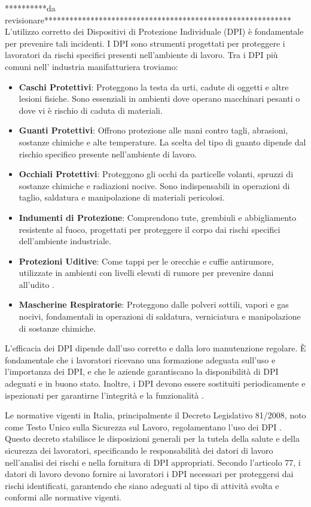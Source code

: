 **********da revisionare***********************************************************
\noindent L'utilizzo corretto dei Dispositivi di Protezione Individuale (DPI) è fondamentale per prevenire tali incidenti. I DPI sono strumenti progettati per proteggere i lavoratori da rischi specifici presenti nell'ambiente di lavoro. Tra i DPI più comuni nell' industria manifatturiera troviamo:

\begin{itemize}
    \item \textbf{Caschi Protettivi}: Proteggono la testa da urti, cadute di oggetti e altre lesioni fisiche. Sono essenziali in ambienti dove operano macchinari pesanti o dove vi è rischio di caduta di materiali.
    \item \textbf{Guanti Protettivi}: Offrono protezione alle mani contro tagli, abrasioni, sostanze chimiche e alte temperature. La scelta del tipo di guanto dipende dal rischio specifico presente nell'ambiente di lavoro.
    \item \textbf{Occhiali Protettivi}: Proteggono gli occhi da particelle volanti, spruzzi di sostanze chimiche e radiazioni nocive. Sono indispensabili in operazioni di taglio, saldatura e manipolazione di materiali pericolosi.
    \item \textbf{Indumenti di Protezione}: Comprendono tute, grembiuli e abbigliamento resistente al fuoco, progettati per proteggere il corpo dai rischi specifici dell'ambiente industriale.
    \item \textbf{Protezioni Uditive}: Come tappi per le orecchie e cuffie antirumore, utilizzate in ambienti con livelli elevati di rumore per prevenire danni all'udito \cite{dpisicurezza}.
    \item \textbf{Mascherine Respiratorie}: Proteggono dalle polveri sottili, vapori e gas nocivi, fondamentali in operazioni di saldatura, verniciatura e manipolazione di sostanze chimiche.
\end{itemize}

L'efficacia dei DPI dipende dall'uso corretto e dalla loro manutenzione regolare. È fondamentale che i lavoratori ricevano una formazione adeguata sull'uso e l'importanza dei DPI, e che le aziende garantiscano la disponibilità di DPI adeguati e in buono stato. Inoltre, i DPI devono essere sostituiti periodicamente e ispezionati per garantirne l’integrità e la funzionalità \cite{dpisicurezza}.

Le normative vigenti in Italia, principalmente il Decreto Legislativo 81/2008, noto come Testo Unico sulla Sicurezza sul Lavoro, regolamentano l'uso dei DPI \cite{decreto81}. Questo decreto stabilisce le disposizioni generali per la tutela della salute e della sicurezza dei lavoratori, specificando le responsabilità dei datori di lavoro nell'analisi dei rischi e nella fornitura di DPI appropriati. Secondo l'articolo 77, i datori di lavoro devono fornire ai lavoratori i DPI necessari per proteggersi dai rischi identificati, garantendo che siano adeguati al tipo di attività svolta e conformi alle normative vigenti.

